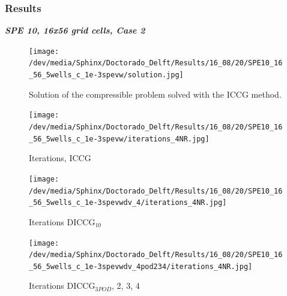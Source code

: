 \documentclass{beamer}
\begin{document}
\begin{frame}[shrink=5]
\frametitle{Results}
\emph{\Large \textbf{SPE 10, 16x56 grid cells, Case 2}}
\begin{figure}[!h]
\centering 
\begin{minipage}{.45\textwidth}
 \centering
\texttt{[image: /dev/media/Sphinx/Doctorado\_Delft/Results/16\_08/20/SPE10\_16\_56\_5wells\_c\_1e-3spevw/solution.jpg]}
\caption{Solution of the compressible problem solved with the ICCG method.}
\label{fig:compsol}
\end{minipage}%
\hspace{10mm}
\begin{minipage}{.45\textwidth}
 \centering
\texttt{[image: /dev/media/Sphinx/Doctorado\_Delft/Results/16\_08/20/SPE10\_16\_56\_5wells\_c\_1e-3spevw/iterations\_4NR.jpg]}
\caption{Iterations, ICCG}
\label{fig:NR_IC}
\end{minipage}
\end{figure}
\begin{figure}[!h]
\centering
\begin{minipage}{.4\textwidth}
 \centering
\texttt{[image: /dev/media/Sphinx/Doctorado\_Delft/Results/16\_08/20/SPE10\_16\_56\_5wells\_c\_1e-3spevwdv\_4/iterations\_4NR.jpg]}
\caption{Iterations DICCG$_{10}$}
\label{fig:NR_D10}
\end{minipage}%
\hspace{15mm}
\begin{minipage}{.4\textwidth}
 \centering
\texttt{[image: /dev/media/Sphinx/Doctorado\_Delft/Results/16\_08/20/SPE10\_16\_56\_5wells\_c\_1e-3spevwdv\_4pod234/iterations\_4NR.jpg]}
\caption{Iterations DICCG$_{3POD}$, 2, 3, 4}
\label{fig:NR_POD5}
\end{minipage}
\end{figure}
\end{frame}
\end{document}
